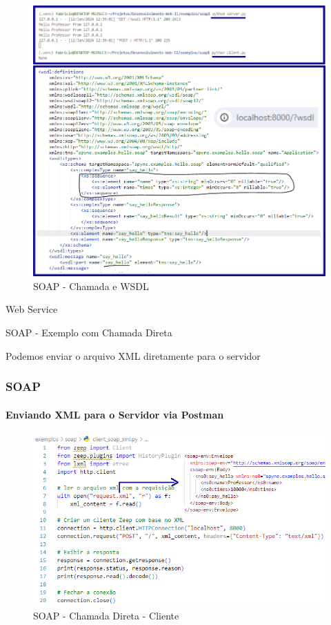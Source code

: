 \documentclass[
	9pt, %
	t, %
]{beamer}
\begin{document}
\begin{frame}[plain, c]
	
	\begin{figure}
		\includegraphics[width=0.75\linewidth]{soap_example.png}
		\caption{SOAP - Chamada e WSDL}
		\label{fig:soap_example}
	\end{figure}

\end{frame}

\begin{frame}
	\begin{center}
		
		\bigskip\bigskip\bigskip\bigskip %
		{\Large Web Service}
		
		\bigskip\bigskip %
		{\Huge SOAP - Exemplo com Chamada Direta}
		
		\smallskip
		{\small Podemos enviar o arquivo XML diretamente para o servidor}
	\end{center}

\end{frame}

\begin{frame}[fragile]
	\frametitle{SOAP}
	\framesubtitle{Enviando XML para o Servidor via Postman}
	
	\begin{figure}
		\includegraphics[width=0.7\linewidth]{client_xml.PNG}
		\caption{SOAP - Chamada Direta - Cliente}
		\label{fig:soap_client_xml}
	\end{figure}

\end{frame}
\end{document}

